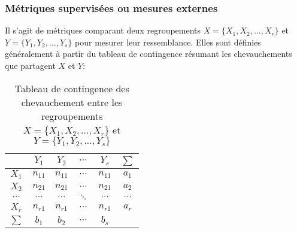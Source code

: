 \subsubsection{Métriques supervisées ou mesures externes}
\label{sec:similarite:biblio:supeval}
Il s'agit de métriques comparant deux regroupements $X = \lbrace X_1, X_2, ..., X_r \rbrace$ et $Y = \lbrace Y_1, Y_2, ..., Y_s \rbrace$ pour mesurer leur ressemblance. Elles sont définies généralement à partir du tableau de contingence résumant les chevauchements que partagent $X$ et $Y$:
\begin{table}[!htb]
	\centering
	\begin{tabular}{|c|c|c|c|c|c|}
		\hline
		& $Y_1$    & $Y_2$    & $\cdots$ & $Y_s$    & $\sum$   \\ \hline
		$X_1$    & $n_{11}$ & $n_{11}$ & $\cdots$ & $n_{11}$ & $a_1$    \\ \hline
		$X_2$    & $n_{21}$ & $n_{21}$ & $\cdots$ & $n_{21}$ & $a_2$    \\ \hline
		$\cdots$ & $\cdots$ & $\cdots$ & $\ddots$ & $\cdots$ & $\cdots$ \\ \hline
		$X_r$    & $n_{r1}$ & $n_{r1}$ & $\cdots$ & $n_{r1}$ & $a_r$    \\ \hline
		$\sum$   & $b_1$    & $b_2$    & $\cdots$ & $b_s$    &          \\ \hline
	\end{tabular}
	\caption{Tableau de contingence des chevauchement entre les regroupements $X = \lbrace X_1, X_2, ..., X_r \rbrace$ et $Y = \lbrace Y_1, Y_2, ..., Y_s \rbrace$}
\end{table}

